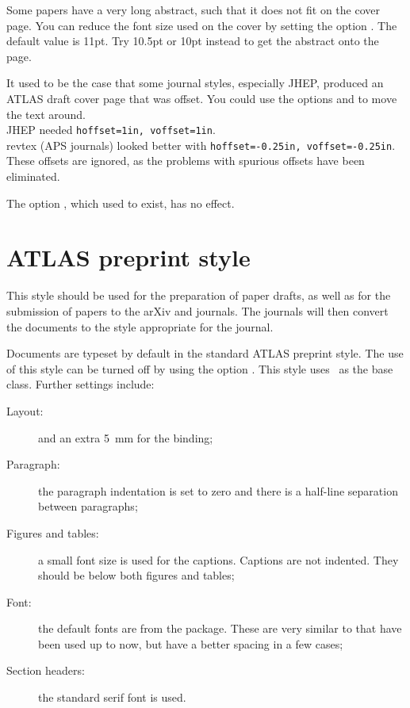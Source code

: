 Some papers have a very long abstract, such that it does not fit on the cover page.
You can reduce the font size used on the cover by setting the option .
The default value is 11pt. Try 10.5pt or 10pt instead to get the abstract onto the page.

It used to be the case that some journal styles, especially JHEP,
produced an ATLAS draft cover page that was offset.
You could use the options  and  to move the text around.\\
JHEP needed \verb|hoffset=1in, voffset=1in|.\\
revtex (APS journals) looked better with  \verb|hoffset=-0.25in, voffset=-0.25in|.\\
 These offsets are ignored,
as the problems with spurious offsets have been eliminated.

The option , which used to exist, has no effect.


\section{ATLAS preprint style}
\label{sec:atlasstyle}

This style should be used for the preparation of paper drafts,
as well as for the submission of papers to the arXiv and journals.
The journals will then convert the documents to the style appropriate for the journal.

Documents are typeset by default in the standard ATLAS preprint style.
The use of this style can be turned off by using the option
.
This style uses \KOMAScript\ as the base class.
Further settings include:
\begin{description}
\item[Layout:]  and an extra \qty{5}{\mm} for the binding;
\item[Paragraph:] the paragraph indentation is set to zero and 
  there is a half-line separation between paragraphs;
\item[Figures and tables:] a small font size is used for the captions.
  Captions are not indented.
  They should be below both figures and tables;
\item[Font:] the default fonts are from the  package.
  These are very similar to  that have been used up to now,
  but have a better spacing in a few cases;
\item[Section headers:] the standard serif font is used.
\end{description}

